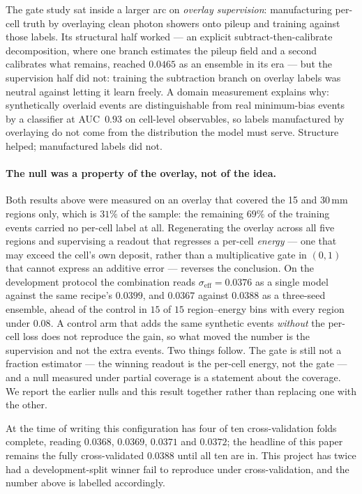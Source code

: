 \documentclass[11pt,a4paper]{article}
\newcommand{\seff}{\ensuremath{\sigma_{\mathrm{eff}}}}
\begin{document}
The gate study sat inside a larger arc on \emph{overlay supervision}:
manufacturing per-cell truth by overlaying clean photon showers onto pileup
and training against those labels. Its structural half worked --- an
explicit subtract-then-calibrate decomposition, where one branch estimates
the pileup field and a second calibrates what remains, reached $0.0465$ as
an ensemble in its era --- but the supervision half did not: training the
subtraction branch on overlay labels was neutral against letting it learn
freely. A domain measurement explains why: synthetically overlaid events
are distinguishable from real minimum-bias events by a classifier at
AUC~$0.93$ on cell-level observables, so labels manufactured by overlaying
do not come from the distribution the model must serve. Structure helped;
manufactured labels did not.

\paragraph{The null was a property of the overlay, not of the idea.} Both
results above were measured on an overlay that covered the 15 and 30\,mm
regions only, which is $31\%$ of the sample: the remaining $69\%$ of the
training events carried no per-cell label at all. Regenerating the overlay
across all five regions and supervising a readout that regresses a per-cell
\emph{energy} --- one that may exceed the cell's own deposit, rather than a
multiplicative gate in $(0,1)$ that cannot express an additive error ---
reverses the conclusion. On the development protocol the combination reads
$\seff = 0.0376$ as a single model against the same recipe's $0.0399$, and
$0.0367$ against $0.0388$ as a three-seed ensemble, ahead of the control in
$15$ of $15$ region--energy bins with every region under $0.08$. A control
arm that adds the same synthetic events \emph{without} the per-cell loss
does not reproduce the gain, so what moved the number is the supervision and
not the extra events. Two things follow. The gate is still not a fraction
estimator --- the winning readout is the per-cell energy, not the gate ---
and a null measured under partial coverage is a statement about the
coverage. We report the earlier nulls and this result together rather than
replacing one with the other.

At the time of writing this configuration has four of ten cross-validation
folds complete, reading $0.0368$, $0.0369$, $0.0371$ and $0.0372$; the
headline of this paper remains the fully cross-validated $0.0388$ until all
ten are in. This project has twice had a development-split winner fail to
reproduce under cross-validation, and the number above is labelled
accordingly.
\end{document}
